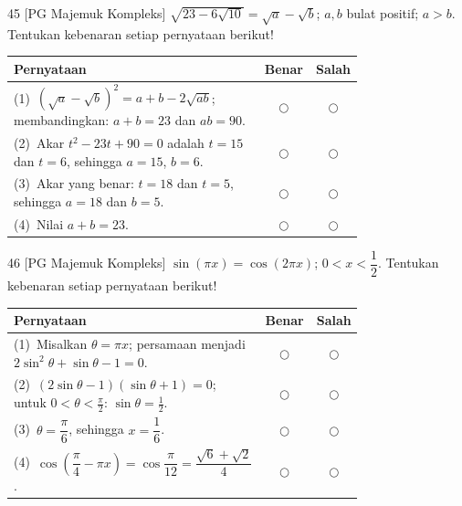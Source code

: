 \documentclass[11pt]{article}
\begin{document}
\begin{soal}{45 \normalfont\small[PG Majemuk Kompleks]}
$\sqrt{23-6\sqrt{10}}=\sqrt{a}-\sqrt{b}$; $a,b$ bulat positif; $a>b$.
Tentukan kebenaran setiap pernyataan berikut!

\par\smallskip
{\renewcommand{\arraystretch}{1.4}%
\begin{tabular}{@{}p{0.76\linewidth}cc@{}}
\hline\textbf{Pernyataan}&\textbf{Benar}&\textbf{Salah}\\\hline
(1)~$(\sqrt{a}-\sqrt{b})^2=a+b-2\sqrt{ab}$; membandingkan: $a+b=23$ dan $ab=90$.&$\bigcirc$&$\bigcirc$\\
(2)~Akar $t^2-23t+90=0$ adalah $t=15$ dan $t=6$, sehingga $a=15$, $b=6$.&$\bigcirc$&$\bigcirc$\\
(3)~Akar yang benar: $t=18$ dan $t=5$, sehingga $a=18$ dan $b=5$.&$\bigcirc$&$\bigcirc$\\
(4)~Nilai $a+b=23$.&$\bigcirc$&$\bigcirc$\\\hline
\end{tabular}}
\end{soal}

\begin{soal}{46 \normalfont\small[PG Majemuk Kompleks]}
$\sin(\pi x)=\cos(2\pi x)$; $0<x<\dfrac{1}{2}$. Tentukan kebenaran
setiap pernyataan berikut!

\par\smallskip
{\renewcommand{\arraystretch}{1.4}%
\begin{tabular}{@{}p{0.76\linewidth}cc@{}}
\hline\textbf{Pernyataan}&\textbf{Benar}&\textbf{Salah}\\\hline
(1)~Misalkan $\theta=\pi x$; persamaan menjadi $2\sin^2\theta+\sin\theta-1=0$.&$\bigcirc$&$\bigcirc$\\
(2)~$(2\sin\theta-1)(\sin\theta+1)=0$; untuk $0<\theta<\tfrac\pi2$: $\sin\theta=\tfrac12$.&$\bigcirc$&$\bigcirc$\\
(3)~$\theta=\dfrac{\pi}{6}$, sehingga $x=\dfrac{1}{6}$.&$\bigcirc$&$\bigcirc$\\
(4)~$\cos\!\left(\dfrac{\pi}{4}-\pi x\right)=\cos\dfrac{\pi}{12}=\dfrac{\sqrt{6}+\sqrt{2}}{4}$.&$\bigcirc$&$\bigcirc$\\\hline
\end{tabular}}
\end{soal}
\end{document}
